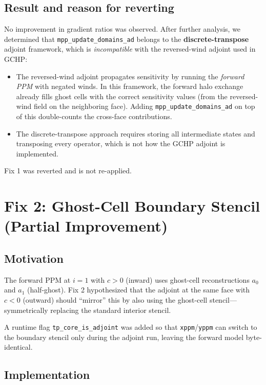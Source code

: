 \documentclass[11pt]{article}
\begin{document}
\subsection{Result and reason for reverting}

No improvement in gradient ratios was observed. After further analysis, we
determined that \texttt{mpp\_update\_domains\_ad} belongs to the
\textbf{discrete-transpose} adjoint framework, which is \emph{incompatible}
with the reversed-wind adjoint used in GCHP:
\begin{itemize}
  \item The reversed-wind adjoint propagates sensitivity by running the
    \emph{forward PPM} with negated winds. In this framework, the
    forward halo exchange already fills ghost cells with the correct
    sensitivity values (from the reversed-wind field on the neighboring
    face). Adding \texttt{mpp\_update\_domains\_ad} on top of this
    double-counts the cross-face contributions.
  \item The discrete-transpose approach requires storing all intermediate
    states and transposing every operator, which is not how the GCHP
    adjoint is implemented.
\end{itemize}
Fix 1 was reverted and is not re-applied.

\section{Fix 2: Ghost-Cell Boundary Stencil (Partial Improvement)}

\subsection{Motivation}

The forward PPM at $i=1$ with $c > 0$ (inward) uses ghost-cell
reconstructions $a_0$ and $a_1$ (half-ghost). Fix 2 hypothesized that the
adjoint at the same face with $c < 0$ (outward) should ``mirror'' this
by also using the ghost-cell stencil---symmetrically replacing the standard
interior stencil.

A runtime flag \texttt{tp\_core\_is\_adjoint} was added so that
\texttt{xppm}/\texttt{yppm} can switch to the boundary stencil only during
the adjoint run, leaving the forward model byte-identical.

\subsection{Implementation}
\end{document}
